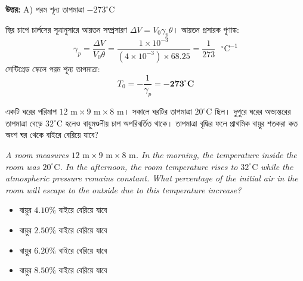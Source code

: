\documentclass[12pt, a4paper]{article}
\begin{document}
\vspace{0.5em}
\begin{tcolorbox}[answerbox]
    \textbf{\color{success} উত্তর:} A) পরম শূন্য তাপমাত্রা $-273^\circ\text{C}$
\end{tcolorbox}
\vspace{1em}

\begin{tcolorbox}[solutionbox={সমাধান (Solution)}]
    \noindent
    স্থির চাপে চার্লসের সূত্রানুসারে আয়তন সম্প্রসারণ $\Delta V = V_0 \gamma_p \theta$। আয়তন প্রসারক গুণাঙ্ক:
    \[ \gamma_p = \frac{\Delta V}{V_0 \theta} = \frac{1 \times 10^{-3}}{(4 \times 10^{-3}) \times 68.25} = \frac{1}{273}\text{ }^\circ\text{C}^{-1} \]
    সেন্টিগ্রেড স্কেলে পরম শূন্য তাপমাত্রা:
    \[ T_0 = -\frac{1}{\gamma_p} = \mathbf{-273^\circ\text{C}} \]
\end{tcolorbox}

\vspace{2em}

\begin{tcolorbox}[questionbox={প্রশ্ন (Question) 8}]
    \noindent
    একটি ঘরের পরিমাপ $12\text{ m} \times 9\text{ m} \times 8\text{ m}$। সকালে ঘরটির তাপমাত্রা $20^\circ\text{C}$ ছিল। দুপুরে ঘরের অভ্যন্তরের তাপমাত্রা বেড়ে $32^\circ\text{C}$ হলেও বায়ুমণ্ডলীয় চাপ অপরিবর্তিত থাকে। তাপমাত্রা বৃদ্ধির ফলে প্রাথমিক বায়ুর শতকরা কত অংশ ঘর থেকে বাইরে বেরিয়ে যাবে?
    
    \vspace{0.8em}
    \begin{english}
    \noindent\textit{\color{darkgray}
    A room measures $12\text{ m} \times 9\text{ m} \times 8\text{ m}$. In the morning, the temperature inside the room was $20^\circ\text{C}$. In the afternoon, the room temperature rises to $32^\circ\text{C}$ while the atmospheric pressure remains constant. What percentage of the initial air in the room will escape to the outside due to this temperature increase?
    }
    \end{english}
\end{tcolorbox}

\begin{itemize}[label={}, leftmargin=1cm, itemsep=0.5em]
    \item[\textbf{A)}] বায়ুর $4.10\%$ বাইরে বেরিয়ে যাবে
    \item[\textbf{B)}] বায়ুর $2.50\%$ বাইরে বেরিয়ে যাবে
    \item[\textbf{C)}] বায়ুর $6.20\%$ বাইরে বেরিয়ে যাবে
    \item[\textbf{D)}] বায়ুর $8.50\%$ বাইরে বেরিয়ে যাবে
\end{itemize}
\end{document}

